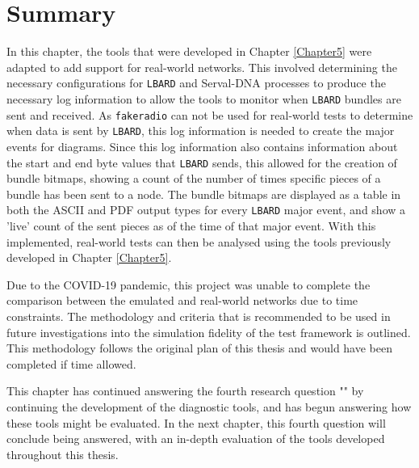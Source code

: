 \section{Summary}
In this chapter, the tools that were developed in Chapter \ref{Chapter5} were adapted to add support for real-world networks.
This involved determining the necessary configurations for \texttt{LBARD} and Serval-DNA processes to produce the necessary log information to allow the tools to monitor when \texttt{LBARD} bundles are sent and received.
As \texttt{fakeradio} can not be used for real-world tests to determine when data is sent by \texttt{LBARD}, this log information is needed to create the major events for diagrams.
Since this log information also contains information about the start and end byte values that \texttt{LBARD} sends, this allowed for the creation of bundle bitmaps, showing a count of the number of times specific pieces of a bundle has been sent to a node.
The bundle bitmaps are displayed as a table in both the ASCII and PDF output types for every \texttt{LBARD} major event, and show a 'live' count of the sent pieces as of the time of that major event.
With this implemented, real-world tests can then be analysed using the tools previously developed in Chapter \ref{Chapter5}.

Due to the COVID-19 pandemic, this project was unable to complete the comparison between the emulated and real-world networks due to time constraints. 
The methodology and criteria that is recommended to be used in future investigations into the simulation fidelity of the test framework is outlined. 
This methodology follows the original plan of this thesis and would have been completed if time allowed.

This chapter has continued answering the fourth research question "\fourthRQ" by continuing the development of the diagnostic tools, and has begun answering how these tools might be evaluated.
In the next chapter, this fourth question will conclude being answered, with an in-depth evaluation of the tools developed throughout this thesis.